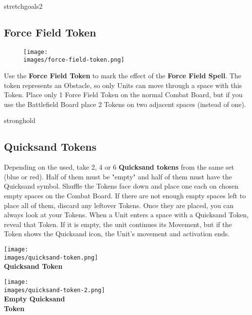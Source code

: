 \begin{multicols}{2}
\begin{expansion}{stretchgoals2}
    \subsection*{Force Field Token}
    \setlength\intextsep{0pt}
    \setlength\columnsep{1em}
    \begin{wrapfigure}{r}{0.2\linewidth}
        \texttt{[image: \\images/force-field-token.png]}
    \end{wrapfigure}
    Use the \textbf{Force Field Token} to mark the effect of the \textbf{Force Field Spell}.
    The token represents an Obstacle, so only  Units can move through a space with this Token.
    Place only 1 Force Field Token on the normal Combat Board, but if you use the Battlefield Board place 2 Tokens on two adjacent spaces (instead of one).
\end{expansion}

\vspace*{1em}
\begin{expansion}{stronghold}
    \subsection*{Quicksand Tokens}
    Depending on the  used, take 2, 4 or 6 \textbf{Quicksand tokens} from the same set (blue or red).
    Half of them must be "empty" and half of them must have the Quicksand symbol.
    Shuffle the Tokens face down and place one each on chosen empty spaces on the Combat Board.
    If there are not enough empty spaces left to place all of them, discard any leftover Tokens.
    Once they are placed, you can always look at your Tokens.
    When a Unit enters a space with a Quicksand Token, reveal that Token.
    If it is empty, the unit continues its Movement, but if the Token shows the Quicksand icon, the Unit's movement and activation ends.
    \bigskip
    \begin{multicols*}{2}
        \centering
        \texttt{[image: \\images/quicksand-token.png]}\\
        \textbf{\scriptsize\color{darkcandyapplered}Quicksand Token\\}

        \columnbreak
        \texttt{[image: \\images/quicksand-token-2.png]}\\
        \textbf{\scriptsize\color{darkcandyapplered}Empty Quicksand\\Token\\}
    \end{multicols*}
\end{expansion}


\end{multicols}
